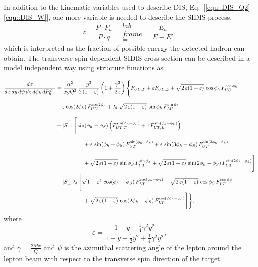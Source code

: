 In addition to the kinematic variables used to describe DIS,
Eq.~[\ref{equ::DIS_Q2}-\ref{equ::DIS_W}], one more variable is needed to
describe the SIDIS process,
\begin{equation}
  z = \frac{P \cdot P_h}{P \cdot q} \quad \substack{lab \\frame\\ =} \quad
  \frac{E_h}{E-E'},
\end{equation}
\noindent
which is interpreted as the fraction of possible energy the detected hadron
can obtain.  The transverse spin-dependent SIDIS cross-section can be described
in a model independent way using structure functions as~\cite{Bacchetta:2006tn}

\begin{align}
  \frac{d\sigma}{dx \, dy\, d\psi \,dz\, d\phi_h\, d P_{h\perp}^2} &=
  \frac{\alpha^2}{x y Q^2}\,
  \frac{y^2}{2\,(1-\varepsilon)}\,  \biggl( 1+\frac{\gamma^2}{2x} \biggr)\,
  \Biggl\{
  F_{UU ,T}
  + 
  \varepsilon
  F_{UU ,L}
  + \sqrt{2\,\varepsilon (1+\varepsilon)}\,\cos\phi_h\,
  F_{UU}^{\cos\phi_h}
  \nonumber \\  & 
  + \varepsilon \cos(2\phi_h)\, 
  F_{UU}^{\cos 2\phi_h}
  + \lambda_l\, \sqrt{2\,\varepsilon (1-\varepsilon)}\, 
  \sin\phi_h\, 
  F_{LU}^{\sin\phi_h}
  \phantom{\Bigg[ \Bigg] }
  \nonumber \\  & 
  + |S_\perp|\, \Bigg[
    \sin(\phi_h-\phi_S)\,
    \Bigl(F_{UT ,T}^{\sin\left(\phi_h -\phi_S\right)}
    + \varepsilon\, F_{UT ,L}^{\sin\left(\phi_h -\phi_S\right)}\Bigr)
    \nonumber \\  & \quad  \qquad \qquad
    + \varepsilon\, \sin(\phi_h+\phi_S)\, 
    F_{UT}^{\sin\left(\phi_h +\phi_S\right)}
    + \varepsilon\, \sin(3\phi_h-\phi_S)\,
    F_{UT}^{\sin\left(3\phi_h -\phi_S\right)}
    \phantom{\Bigg[ \Bigg] }
    \nonumber \\  & \quad \qquad \qquad
    + \sqrt{2\,\varepsilon (1+\varepsilon)}\, 
    \sin\phi_S\, 
    F_{UT}^{\sin \phi_S }
    + \sqrt{2\,\varepsilon (1+\varepsilon)}\, 
    \sin(2\phi_h-\phi_S)\,  
    F_{UT}^{\sin\left(2\phi_h -\phi_S\right)}
    \Bigg]
  \nonumber \\  &
  + |S_\perp| \lambda_l\, \Bigg[
    \sqrt{1-\varepsilon^2}\, \cos(\phi_h-\phi_S)\, 
    F_{LT}^{\cos(\phi_h -\phi_S)}
    +\sqrt{2\,\varepsilon (1-\varepsilon)}\, 
    \cos\phi_S\, 
    F_{LT}^{\cos \phi_S}
    \nonumber \\  & \quad \qquad \qquad
    +\sqrt{2\,\varepsilon (1-\varepsilon)}\, 
    \cos(2\phi_h-\phi_S)\,  
    F_{LT}^{\cos(2\phi_h - \phi_S)}
    \Bigg] \Biggr\},
  \label{equ::SIDISxsect}
\end{align}
\noindent
where
\begin{equation}
  \varepsilon =
  \frac{1-y-\frac{1}{4}\gamma^2y^2}{1-y+\frac{1}{2}y^2+\frac{1}{4}\gamma^2y^2},
\end{equation}
\noindent
and $\gamma = \frac{2Mx}{Q}$ and $\psi$ is the azimuthal scattering angle of the
lepton around the lepton beam with respect to the transverse spin direction of
the target.


